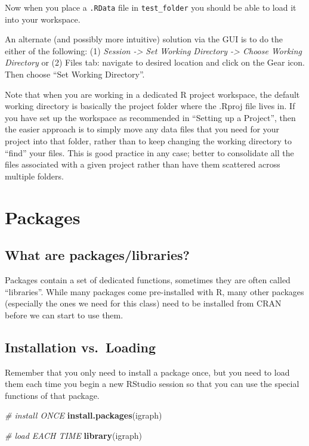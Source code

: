 \documentclass[
]{book}
\newenvironment{Shaded}{\begin{snugshade}}{\end{snugshade}}
\newcommand{\CommentTok}[1]{\textcolor[rgb]{0.56,0.35,0.01}{\textit{#1}}}
\newcommand{\FunctionTok}[1]{\textcolor[rgb]{0.13,0.29,0.53}{\textbf{#1}}}
\newcommand{\NormalTok}[1]{#1}
\newcommand{\StringTok}[1]{\textcolor[rgb]{0.31,0.60,0.02}{#1}}
\begin{document}
Now when you place a \texttt{.RData} file in \texttt{test\_folder} you should be able to load it into your workspace.

An alternate (and possibly more intuitive) solution via the GUI is to do the either of the following: (1) \emph{Session -\textgreater{} Set Working Directory -\textgreater{} Choose Working Directory} or (2) Files tab: navigate to desired location and click on the Gear icon. Then choose ``Set Working Directory''.

Note that when you are working in a dedicated R project workspace, the default working directory is basically the project folder where the .Rproj file lives in. If you have set up the workspace as recommended in ``Setting up a Project'', then the easier approach is to simply move any data files that you need for your project into that folder, rather than to keep changing the working directory to ``find'' your files. This is good practice in any case; better to consolidate all the files associated with a given project rather than have them scattered across multiple folders.

\section{Packages}\label{packages}

\subsection{What are packages/libraries?}\label{what-are-packageslibraries}

Packages contain a set of dedicated functions, sometimes they are often called ``libraries''. While many packages come pre-installed with R, many other packages (especially the ones we need for this class) need to be installed from CRAN before we can start to use them.

\subsection{Installation vs.~Loading}\label{installation-vs.-loading}

Remember that you only need to install a package once, but you need to load them each time you begin a new RStudio session so that you can use the special functions of that package.

\begin{Shaded}
\begin{Highlighting}[]
\CommentTok{\# install ONCE}
\FunctionTok{install.packages}\NormalTok{(}\StringTok{\textquotesingle{}igraph\textquotesingle{}}\NormalTok{)}

\CommentTok{\# load EACH TIME}
\FunctionTok{library}\NormalTok{(igraph)}
\end{Highlighting}
\end{Shaded}
\end{document}
